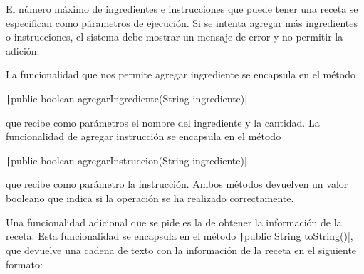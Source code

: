 \documentclass[
    a4paper, %
    12pt, %
]{CSSullivanBusinessReport}
\begin{document}
El número máximo de ingredientes e instrucciones que puede tener una receta se especifican como párametros de ejecución. Si se intenta agregar más ingredientes o instrucciones, el sistema debe mostrar un mensaje de error y no permitir la adición:


La funcionalidad que nos permite agregar ingrediente se encapsula en el método 

\texttt|public boolean agregarIngrediente(String ingrediente)|

que recibe como parámetros el nombre del ingrediente y la cantidad. La funcionalidad de agregar instrucción se encapsula en el método

\texttt|public boolean agregarInstruccion(String ingrediente)|

que recibe como parámetro la instrucción. Ambos métodos devuelven un valor booleano que indica si la operación se ha realizado correctamente.

Una funcionalidad adicional que se pide es la de obtener la información de la receta. Esta funcionalidad se encapsula en el método \texttt|public String toString()|, que devuelve una cadena de texto con la información de la receta en el siguiente formato:

\end{document}
